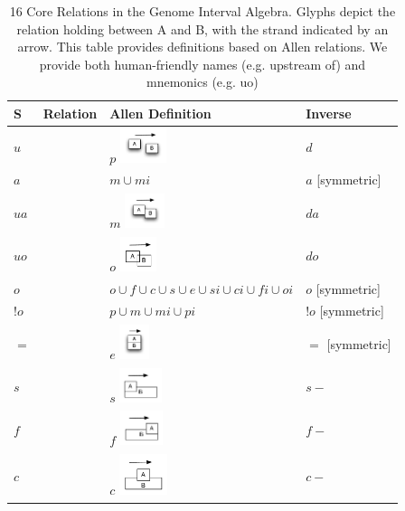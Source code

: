 \documentclass{article}
\def\upstreamOf{\pr{upstream\_of}}
\def\downstreamOf{\pr{downstream\_of}}
\def\adjacentTo{\pr{adjacent\_to}}
\def\upstreamAdjacentTo{\pr{upstream\_adjacent\_to}}
\def\downstreamAdjacentTo{\pr{downstream\_adjacent\_to}}
\def\upstreamOverlaps{\pr{upstream\_overlaps}}
\def\downstreamOverlaps{\pr{downstream\_overlaps}}
\def\overlaps{\pr{overlaps}}
\def\containedBy{\pr{nt\_contained\_by}}
\def\contains{\pr{nt\_contains}}
\def\disconnectedFrom{\pr{disconnected\_from}}
\def\coextensiveWith{\pr{coextensive\_with}}
\def\starts{\pr{starts}}
\def\startedBy{\pr{started\_by}}
\def\finishes{\pr{finishes}}
\def\finishedBy{\pr{finished\_by}}
\begin{document}
\begin{table}
\begin{tabular}{ | p{5mm} | p{3cm} | p{3cm} | p{3cm} | }
\hline
S & Relation  & Allen Definition  & Inverse \\
\hline
$u$ & \upstreamOf {} & $p$ \includegraphics[height=1cm]{u}  & $d$ \small{\downstreamOf} \\
\hline
$a$ & \adjacentTo & $m \cup mi$ & $a$  [symmetric] \\
\hline
$ua$ & \small{\upstreamAdjacentTo} {} & $m$ \includegraphics[height=1cm]{ua}   & $da$ \small{\downstreamAdjacentTo} \\
\hline
$uo$ & \small{\upstreamOverlaps} {} & $o$ \includegraphics[height=1cm]{uo} & $do$ \small{\downstreamOverlaps} \\
\hline
$o$ & \overlaps & $o \cup f \cup c \cup s \cup e \cup si \cup ci \cup fi \cup oi$  & $o$ [symmetric] \\
\hline
$!o$ & \disconnectedFrom & $p \cup m \cup mi \cup pi$  & $!o$ [symmetric] \\
\hline
$=$ & \coextensiveWith {} &  $e$  \includegraphics[height=1cm]{eq}  & $=$ [symmetric] \\
\hline
$s$ & \starts {} & $s$ \includegraphics[height=1cm]{s} &  $s-$ \small{\startedBy} \\
\hline
$f$ & \finishes {} & $f$ \includegraphics[height=1cm]{f} &  $f-$ \small{\finishedBy} \\
\hline
$c$ & \containedBy {} & $c$ \includegraphics[height=1.2cm]{p} &  $c-$ \small{\contains} \\
\hline
\end{tabular}
\caption{16 Core Relations in the Genome Interval Algebra. Glyphs depict
  the relation holding between A and B, with the strand indicated by an arrow.
  This table provides definitions based on Allen relations. We provide both human-friendly names (e.g. upstream of) and mnemonics (e.g. uo) }
\label{tab:relations}
\end{table}
\end{document}
